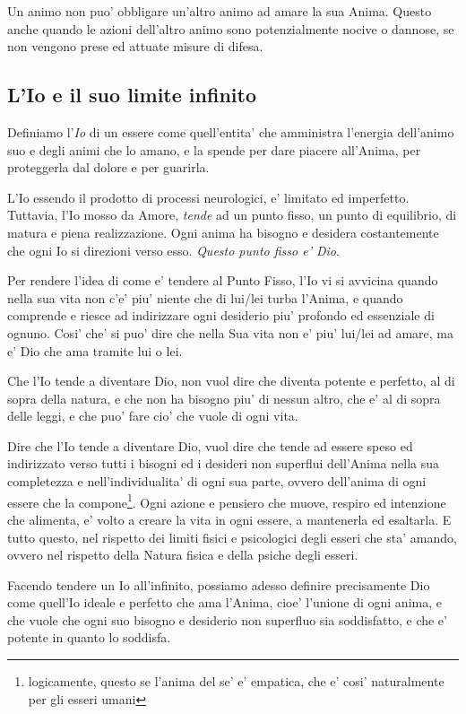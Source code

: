 Un animo non puo' obbligare un'altro animo ad amare la sua Anima. Questo anche quando le azioni dell'altro animo sono potenzialmente nocive o dannose, se non vengono prese ed attuate misure di difesa.\\

\subsection{L'Io e il suo limite infinito}

Definiamo l'\emph{Io} di un essere come quell'entita' che amministra l'energia dell'animo suo e degli animi che lo amano, e la spende per dare piacere all'Anima, per proteggerla dal dolore e per guarirla.

L'Io essendo il prodotto di processi neurologici, e' limitato ed imperfetto. Tuttavia, l'Io mosso da Amore, \emph{tende} ad un punto fisso, un punto di equilibrio, di matura e piena realizzazione. Ogni anima ha bisogno e desidera costantemente che ogni Io si direzioni verso esso. \emph{Questo punto fisso e' Dio}.

Per rendere l'idea di come e' tendere al Punto Fisso, l'Io vi si avvicina quando nella sua vita non c'e' piu' niente che di lui/lei turba l'Anima, e quando comprende e riesce ad indirizzare ogni desiderio piu' profondo ed essenziale di ognuno. Cosi' che' si puo' dire che nella Sua vita non e' piu' lui/lei ad amare, ma e' Dio che ama tramite lui o lei.

Che l'Io tende a diventare Dio, non vuol dire che diventa potente e perfetto, al di sopra della natura, e che non ha bisogno piu' di nessun altro, che e' al di sopra delle leggi, e che puo' fare cio' che vuole di ogni vita. 

Dire che l'Io tende a diventare Dio, vuol dire che tende ad essere speso ed indirizzato verso tutti i bisogni ed i desideri non superflui dell'Anima nella sua completezza e nell'individualita' di ogni sua parte, ovvero dell'anima di ogni essere che la compone\footnote{logicamente, questo se l'anima del se' e' empatica, che e' cosi' naturalmente per gli esseri umani}. Ogni azione e pensiero che muove, respiro ed intenzione che alimenta, e' volto a creare la vita in ogni essere, a mantenerla ed esaltarla. E tutto questo, nel rispetto dei limiti fisici e psicologici degli esseri che sta' amando, ovvero nel rispetto della Natura fisica e della psiche degli esseri.

Facendo tendere un Io all'infinito, possiamo adesso definire precisamente Dio come quell'Io ideale e perfetto che ama l'Anima, cioe' l'unione di ogni anima, e che vuole che ogni suo bisogno e desiderio non superfluo sia soddisfatto, e che e' potente in quanto lo soddisfa.

